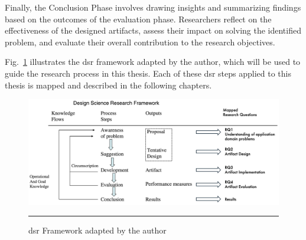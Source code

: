 Finally, the Conclusion Phase involves drawing insights and summarizing findings based on the outcomes of the evaluation phase.
Researchers reflect on the effectiveness of the designed artifacts, assess their impact on solving the identified problem, and evaluate their overall contribution to the research objectives.

Fig.~\ref{fig:design-science-research-framework-adapted-by-author} illustrates the \gls{dsr} framework adapted by the author, which will be used to guide the research process in this thesis.
Each of these \gls{dsr} steps applied to this thesis is mapped and described in the following chapters.
\begin{figure}[htbp]
    \centering
 \includegraphics[width=.9\textwidth]{figures/research-design/design-science-research-framework-by-author.png}
     \rule{35em}{0.5pt}
    \caption{\acrlong{dsr} Framework adapted by the author} 
 \label{fig:design-science-research-framework-adapted-by-author}
\end{figure}

